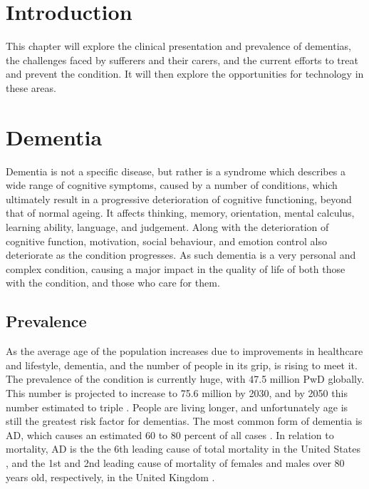  \label{chapter: lit-review}

\section{Introduction}
This chapter will explore the clinical presentation and prevalence of dementias, the challenges faced by sufferers and their carers, and the current efforts to treat and prevent the condition. It will then explore the opportunities for technology in these areas.

\section{Dementia}
Dementia is not a specific disease, but rather is a syndrome which describes a wide range of cognitive symptoms, caused by a number of conditions, which ultimately result in a progressive deterioration of cognitive functioning, beyond that of normal ageing. It affects thinking, memory, orientation, mental calculus, learning ability, language, and judgement. Along with the deterioration of cognitive function, motivation, social behaviour, and emotion control also deteriorate as the condition progresses.
As such dementia is a very personal and complex condition, causing a major impact in the quality of life of both those with the condition, and those who care for them.

\subsection{Prevalence}
As the average age of the population increases due to improvements in healthcare and lifestyle, dementia, and the number of people in its grip, is rising to meet it.
The prevalence of the condition is currently huge, with 47.5 million PwD globally. This number is projected to increase to 75.6 million by 2030, and by 2050 this number estimated to triple \cite{WHODementia2015}. People are living longer, and unfortunately age is still the greatest risk factor for dementias. The most common form of dementia is AD, which causes an estimated 60 to 80 percent of all cases \cite{2015AlzheimersDiseaseFactsFigures}. In relation to mortality, AD is the the 6th leading cause of total mortality in the United States \cite{NationalCenterforHealthStatistics2014}, and the 1st and 2nd leading cause of mortality of females and males over 80 years old, respectively, in the United Kingdom \cite{OfficeforNationalStatistics2014}.

